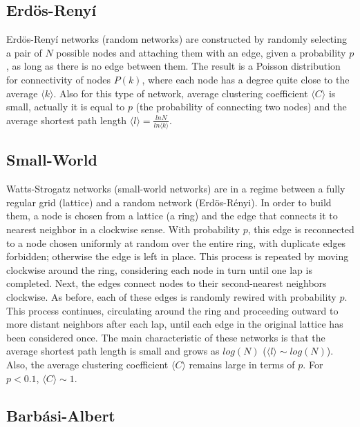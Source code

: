 \documentclass[11pt]{article}
\begin{document}
\subsection{Erd\"{o}s-Reny\'i}

Erd\"{o}s-Reny\'i networks \cite{Erdos1959} (random networks) are constructed by randomly selecting a pair of $N$ possible nodes and attaching them with an edge, given a probability $p$, as long as there is no edge between them. The result is a Poisson distribution for connectivity of nodes $P(k)$, where each node has a degree quite close to the average $\langle k \rangle$. Also for this type of network, average clustering coefficient  $\langle C \rangle$ is small, actually it is equal to $p$ (the probability of connecting two nodes) and the average shortest path length $\langle l \rangle = \frac{lnN}{ln\langle k \rangle}$.


\subsection{Small-World}

Watts-Strogatz networks \cite{Watts1998} (small-world networks) are in a regime between a fully regular grid (lattice) and a random network (Erd\"{o}s-R\'enyi). In order to build them, a node is chosen from a lattice (a ring) and the edge that connects it to nearest neighbor in a clockwise sense. With probability $p$, this edge is reconnected to a node chosen uniformly at random over the entire ring, with duplicate edges forbidden; otherwise the edge is left in place. This process is repeated by moving clockwise around the ring, considering each node in turn until one lap is completed. Next, the edges connect nodes to their second-nearest neighbors clockwise. As before, each of these edges is randomly rewired with probability $p$. This process continues, circulating around the ring and proceeding outward to more distant neighbors after each lap, until each edge in the original lattice has been considered once. The main characteristic of these networks is that the average shortest path length is small and grows as $log(N)$ ($\langle l \rangle \sim log(N)$). Also, the average clustering coefficient $\langle C \rangle$ remains large in terms of $p$. For $p < 0.1$, $\langle C \rangle \sim 1$.

\subsection{Barb\'asi-Albert}
\end{document}

